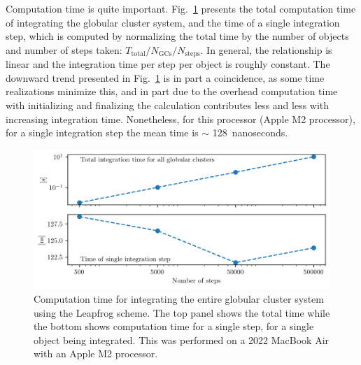         Computation time is quite important. Fig.~\ref{fig:numericalErrorGlobularClustersComputationTime} presents the total computation time of integrating the globular cluster system, and the time of a single integration step, which is computed by normalizing the total time by the number of objects and number of steps taken: $T_{\mathrm{total}}/N_{\mathrm{GCs}}/N_{\mathrm{steps}}$. In general, the relationship is linear and the integration time per step per object is roughly constant. The downward trend presented in Fig.~\ref{fig:numericalErrorGlobularClustersComputationTime} is in part a coincidence, as some time realizations minimize this, and in part due to the overhead computation time with initializing and finalizing the calculation contributes less and less with increasing integration time. Nonetheless, for this processor (Apple M2 processor), for a single integration step the mean time is $\sim$ 128~nanoseconds. 
        \begin{figure}
            \centering
            \includegraphics[width=\linewidth]{images/numericalErrorGlobularClustersComputationTime.png}
            \caption{Computation time for integrating the entire globular cluster system using the Leapfrog scheme. The top panel shows the total time while the bottom shows computation time for a single step, for a single object being integrated. This was performed on a 2022 MacBook Air with an Apple M2 processor. }
            \label{fig:numericalErrorGlobularClustersComputationTime}
        \end{figure}

